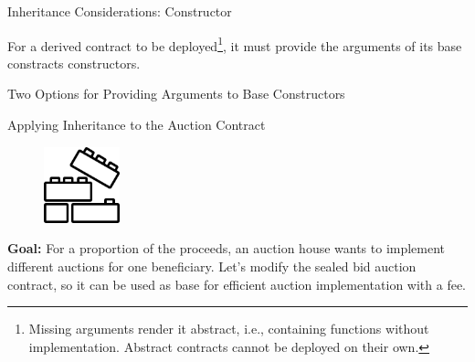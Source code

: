 \documentclass[]{beamer}
\begin{document}
\begin{frame}{Inheritance Considerations: Constructor}

For a derived contract to be deployed\footnote{Missing arguments render it abstract, i.e., containing functions without implementation. Abstract contracts cannot be deployed on their own.}, it must provide the arguments of its base constracts constructors.

\vspace{-0.5em}

\begin{samplecode}{Two Options for Providing Arguments to Base Constructors}
	
\end{samplecode}


\end{frame}


\begin{frame}{Applying Inheritance to the Auction Contract}

\begin{minipage}{0.3\textwidth}
	\begin{figure}
		\center
		\includegraphics[width= 2.2cm]{../assets/images/construction.png}	
	\end{figure}
\end{minipage}
\begin{minipage}{0.65\textwidth}
	\textbf{Goal:} For a proportion of the proceeds, an auction house wants to implement different auctions for one beneficiary. Let's modify the sealed bid auction contract, so it can be used as base for efficient auction implementation with a fee.\\
\end{minipage}

\vspace{3em}


\end{frame}
\end{document}
